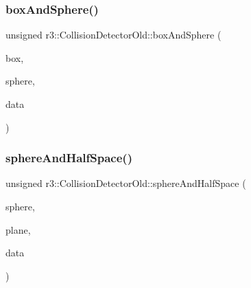 \mbox{\label{classr3_1_1_collision_detector_old_a16fabd7a2ded98f3cb7694f853724541}} 
\subsubsection{\texorpdfstring{box\+And\+Sphere()}{boxAndSphere()}}
{\footnotesize\ttfamily unsigned r3\+::\+Collision\+Detector\+Old\+::box\+And\+Sphere (\begin{DoxyParamCaption}\item[{const \mbox{\hyperlink{classr3_1_1_collision_box}{Collision\+Box}} \&}]{box,  }\item[{const \mbox{\hyperlink{classr3_1_1_collision_sphere}{Collision\+Sphere}} \&}]{sphere,  }\item[{\mbox{\hyperlink{classr3_1_1_collision_data_old}{Collision\+Data\+Old}} $\ast$}]{data }\end{DoxyParamCaption})\hspace{0.3cm}{\ttfamily [static]}}

\mbox{\label{classr3_1_1_collision_detector_old_afac2bf8c0034f33fee66979d69da76e7}} 
\subsubsection{\texorpdfstring{sphere\+And\+Half\+Space()}{sphereAndHalfSpace()}}
{\footnotesize\ttfamily unsigned r3\+::\+Collision\+Detector\+Old\+::sphere\+And\+Half\+Space (\begin{DoxyParamCaption}\item[{const \mbox{\hyperlink{classr3_1_1_collision_sphere}{Collision\+Sphere}} \&}]{sphere,  }\item[{const \mbox{\hyperlink{classr3_1_1_collision_plane}{Collision\+Plane}} \&}]{plane,  }\item[{\mbox{\hyperlink{classr3_1_1_collision_data_old}{Collision\+Data\+Old}} $\ast$}]{data }\end{DoxyParamCaption})\hspace{0.3cm}{\ttfamily [static]}}

